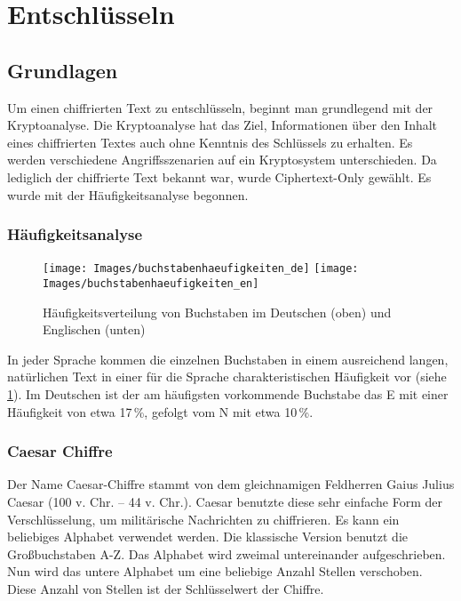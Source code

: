 \section{Entschlüsseln}
\subsection{Grundlagen}

Um einen chiffrierten Text zu entschlüsseln, beginnt man grundlegend mit der Kryptoanalyse. 
Die Kryptoanalyse hat das Ziel, Informationen über den Inhalt eines chiffrierten
Textes auch ohne Kenntnis des Schlüssels zu erhalten. Es werden verschiedene
Angriffsszenarien auf ein Kryptosystem unterschieden. Da lediglich der
chiffrierte Text bekannt war, wurde Ciphertext-Only gewählt. Es wurde mit der
Häufigkeitsanalyse begonnen.

\subsubsection{Häufigkeitsanalyse}

\begin{figure}
 \texttt{[image: Images/buchstabenhaeufigkeiten\_de]}
 \texttt{[image: Images/buchstabenhaeufigkeiten\_en]}
 \caption{Häufigkeitsverteilung von Buchstaben im Deutschen (oben) und Englischen (unten) \cite[kap2.pdf, s. 30]{Koebler}}
 \label{fig:buchstabenhaeufigkeiten}
\end{figure}

In jeder Sprache kommen die einzelnen Buchstaben in einem ausreichend langen,
natürlichen Text in einer für die Sprache charakteristischen Häufigkeit vor
(siehe \cref{fig:buchstabenhaeufigkeiten}). Im Deutschen ist der am
häufigsten vorkommende Buchstabe das E mit einer Häufigkeit von etwa 17\,\%,
gefolgt vom N mit etwa 10\,\%.

\subsubsection{Caesar Chiffre}

Der Name Caesar-Chiffre stammt von dem gleichnamigen Feldherren Gaius Julius
Caesar (100 v. Chr. – 44 v. Chr.). Caesar benutzte diese sehr einfache Form der
Verschlüsselung, um militärische Nachrichten zu chiffrieren.  Es kann ein
beliebiges Alphabet verwendet werden. Die klassische Version benutzt die
Großbuchstaben A-Z. Das Alphabet wird zweimal untereinander aufgeschrieben.
Nun wird das untere Alphabet um eine beliebige Anzahl Stellen verschoben. Diese
Anzahl von Stellen ist der Schlüsselwert der Chiffre.
